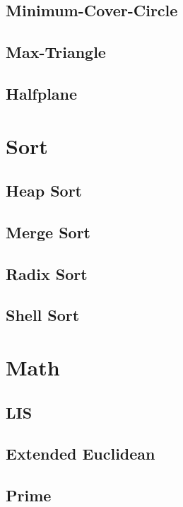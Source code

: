 \documentclass[a4paper,10pt,twocolumn,oneside]{article}
\begin{document}
\subsection{Minimum-Cover-Circle}

\subsection{Max-Triangle}

\subsection{Halfplane}


\section{Sort}
\subsection{Heap Sort}

\subsection{Merge Sort}

\subsection{Radix Sort}

\subsection{Shell Sort}


\section{Math}
\subsection{LIS}

\subsection{Extended Euclidean}

\subsection{Prime}

\end{document}
